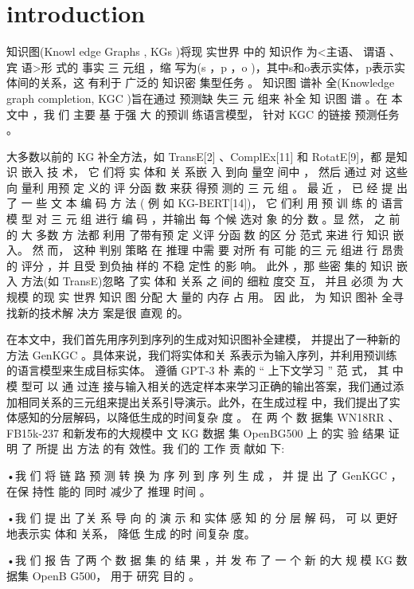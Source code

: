 \documentclass{article}
\begin{document}
\section{introduction}
\par 知识图(Knowl edge Graphs , KGs )将现 实世界 中的 知识作 为<主语、
谓语 、宾 语>形 式的 事实 三 元组 ，缩 写为(s ，p ，o )，其中s和o表示实体，p表示实体间的关系，这 有利于 广泛的 知识密 集型任务 。
知识图 谱补 全(Knowledge graph completion, KGC )旨在通过 预测缺
失三 元 组来 补全 知 识图 谱 。在 本 文中 ，我 们 主要 基 于强 大 的预训
练语言模型， 针对 KGC 的链接 预测任务 。
\par 大多数以前的 KG 补全方法，如 TransE[2] 、ComplEx[11] 和
RotatE[9]，都 是知 识 嵌入 技 术， 它 们将 实 体和 关 系嵌 入 到向 量空
间中 ， 然后 通过 对 这些 向 量利 用预 定 义的 评 分函 数 来获 得预 测的
三 元 组 。 最 近 ， 已 经 提 出 了 一 些 文 本 编 码 方 法 ( 例 如 KG-BERT[14])，
它 们利 用 预 训 练 的 语言 模 型 对 三 元 组 进行 编 码 ，并输出 每 个候 选对 象 的分 数 。显 然， 之 前的 大 多数 方 法都 利用 了带有预 定 义评 分函 数 的区 分 范式 来进 行 知识 嵌 入。 然 而， 这种 判别
策略 在 推理 中需 要 对所 有 可能 的三 元 组进 行 昂贵 的 评分 ，并 且受
到负抽 样的 不稳 定性 的影 响。 此外 ，那 些密 集的 知识 嵌入 方法(如
TransE)忽略 了实 体和 关系 之 间的 细粒 度交 互， 并且 必须 为 大规模
的现 实 世界 知识 图 分配 大 量的 内存 占 用。 因 此， 为 知识 图补 全寻
找新的技术解 决方 案是很 直观 的。
\par 在本文中，我们首先用序列到序列的生成对知识图补全建模，
并提出了一种新的方法 GenKGC 。具体来说，我们将实体和关
系表示为输入序列，并利用预训练的语言模型来生成目标实体。
遵循 GPT-3 朴 素的 “ 上下文学习 ” 范 式， 其 中 模 型可 以 通 过连
接与输入相关的选定样本来学习正确的输出答案，我们通过添
加相同关系的三元组来提出关系引导演示。此外，在生成过程
中，我们提出了实体感知的分层解码，以降低生成的时间复杂
度 。 在 两 个 数 据集 WN18RR 、FB15k-237 和新发布的大规模中
文 KG 数据 集 OpenBG500 上 的实 验 结果 证明 了 所提 出 方法 的有
效性。我 们的 工作 贡 献如 下:
\par •我 们 将 链 路 预 测 转 换 为 序 列 到 序 列 生 成 ， 并 提 出 了
GenKGC ，在保 持性 能的 同时 减少了 推理 时间 。
\par •我 们 提 出 了关 系 导 向 的 演 示 和 实体 感 知 的 分 层 解 码， 可 以
更好地表示实 体和 关系， 降低 生成 的时 间复杂 度。
\par •我 们 报 告 了两 个 数 据 集 的 结 果 ，并 发 布 了 一 个 新 的大 规 模
KG 数据集 OpenB G500， 用于 研究 目的 。
\end{document}
